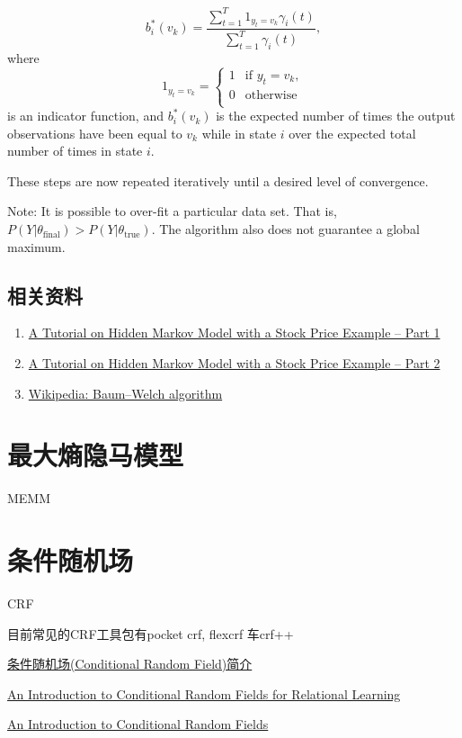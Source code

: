 \[
    b_{i}^{*}(v_{k})={\frac {\sum_{t=1}^{T}1_{y_{t}=v_{k}}\gamma_{i}(t)}{\sum_{t=1}^{T}\gamma_{i}(t)}},
\]
where
\[
    1_{y_{t}=v_{k}}={\begin{cases}
                        1&{\text{if }} y_{t}=v_{k},\\
                        0&{\text{otherwise}}\\
                     \end{cases}}
\]
is an indicator function, and
$b_{i}^{*}(v_{k})$ is the expected number of times the output observations have been equal to
$v_{k}$ while in state $i$ over the expected total number of times in state $i$.

These steps are now repeated iteratively until a desired level of convergence.

Note:
It is possible to over-fit a particular data set. That is, $P(Y|\theta _{\text{final}})>P(Y|\theta _{\text{true}})$.
The algorithm also does not guarantee a global maximum.

\section{相关资料}

\begin{enumerate}
    \item \href{https://codefying.com/2016/09/15/a-tutorial-on-hidden-markov-model-with-a-stock-price-example/}{A Tutorial on Hidden Markov Model with a Stock Price Example – Part 1}
    \item \href{https://codefying.com/2016/09/19/a-tutorial-on-hidden-markov-model-with-a-stock-price-example-part-2/}{A Tutorial on Hidden Markov Model with a Stock Price Example – Part 2}
    \item \href{https://en.wikipedia.org/wiki/Baum–Welch_algorithm}{Wikipedia: Baum–Welch algorithm}
\end{enumerate}





\chapter{最大熵隐马模型}
MEMM


\chapter{条件随机场}
CRF

目前常见的CRF工具包有pocket crf, flexcrf 车crf++

\href{http://blog.csdn.net/aws3217150/article/details/68935789}{条件随机场(Conditional Random Field)简介}

\href{http://people.cs.umass.edu/~mccallum/papers/crf-tutorial.pdf}{An Introduction to Conditional Random Fields for Relational Learning}

\href{https://homepages.inf.ed.ac.uk/csutton/publications/crftutv2.pdf}{An Introduction to Conditional Random Fields}


\ifx\mlbook\undefined
    
\fi
